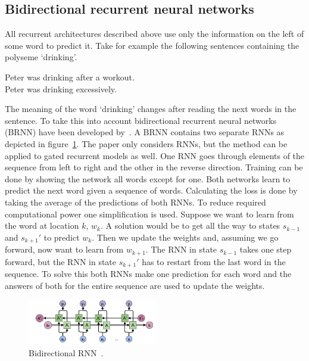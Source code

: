 \subsection{Bidirectional recurrent neural networks}
\label{subsec:bidirectional}
All recurrent architectures described above use only the information on the left of some word to predict it.
Take for example the following sentences containing the polyseme `drinking'.
\begin{center}
    Peter was drinking after a workout.\\[3mm]
    Peter was drinking excessively.
\end{center}
The meaning of the word `drinking' changes after reading the next words in the sentence.
To take this into account bidirectional recurrent neural networks (BRNN) have been developed by~\citet{schuster1997}.
A BRNN contains two separate RNNs as depicted in figure~\ref{fig:bidirectional}.
The paper only considers RNNs, but the method can be applied to gated recurrent models as well.
One RNN goes through elements of the sequence from left to right and the other in the reverse direction.
Training can be done by showing the network all words except for one.
Both networks learn to predict the next word given a sequence of words.
Calculating the loss is done by taking the average of the predictions of both RNNs.
To reduce required computational power one simplification is used.
Suppose we want to learn from the word at location $k$, $w_k$.
A solution would be to get all the way to states $s_{k-1}$ and $s_{k+1}'$ to predict $w_k$.
Then we update the weights and, assuming we go forward, now want to learn from $w_{k+1}$.
The RNN in state $s_{k-1}$ takes one step forward, but the RNN in state $s_{k+1}'$ has to restart from the last word in the sequence.
To solve this both RNNs make one prediction for each word and the answers of both for the entire sequence are used to update the weights.

\begin{figure}[htbp]
    \begin{center}
        \includegraphics[width=0.5\textwidth]{figures/bidirectional.png}
    \end{center}
    \caption{Bidirectional RNN~\citep{olah2015}.}
    \label{fig:bidirectional}
\end{figure}


